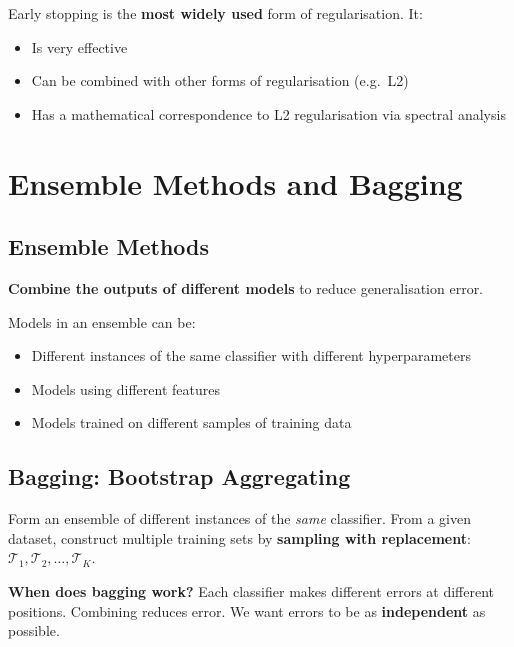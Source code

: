 \documentclass[12pt,a4paper]{article}
\begin{document}
\begin{keybox}
Early stopping is the \textbf{most widely used} form of regularisation. It:
\begin{itemize}
  \item Is very effective
  \item Can be combined with other forms of regularisation (e.g.\ L2)
  \item Has a mathematical correspondence to L2 regularisation via spectral analysis
\end{itemize}
\end{keybox}

\section{Ensemble Methods and Bagging}

\subsection{Ensemble Methods}

\textbf{Combine the outputs of different models} to reduce generalisation error.

Models in an ensemble can be:
\begin{itemize}
  \item Different instances of the same classifier with different hyperparameters
  \item Models using different features
  \item Models trained on different samples of training data
\end{itemize}

\subsection{Bagging: Bootstrap Aggregating}

Form an ensemble of different instances of the \emph{same} classifier. From a given dataset, construct multiple training sets by \textbf{sampling with replacement}: $\mathcal{T}_1, \mathcal{T}_2, \ldots, \mathcal{T}_K$.

\textbf{When does bagging work?} Each classifier makes different errors at different positions. Combining reduces error. We want errors to be as \textbf{independent} as possible.
\end{document}
